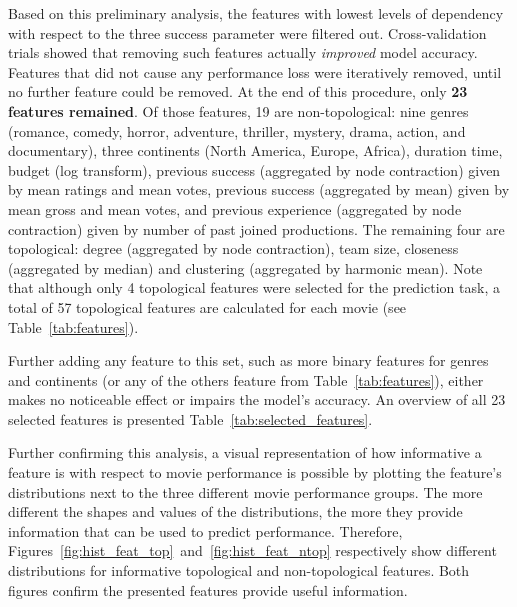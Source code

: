 Based on this preliminary analysis, the features with lowest levels of
dependency with respect to the three success parameter were filtered out.
Cross-validation trials showed that removing such features actually
\textit{improved} model accuracy. Features that did not cause any performance
loss were iteratively removed, until no further feature could be removed.  At
the end of this procedure, only \textbf{23 features remained}. Of those
features, 19 are non-topological: nine genres (romance, comedy, horror,
adventure, thriller, mystery, drama, action, and documentary), three continents
(North America, Europe, Africa), duration time, budget (log transform),
previous success (aggregated by node contraction) given by mean ratings and
mean votes, previous success (aggregated by mean) given by mean gross and mean
votes, and previous experience (aggregated by node contraction) given by number
of past joined productions. The remaining four are topological: degree
(aggregated by node contraction), team size, closeness (aggregated by median)
and clustering (aggregated by harmonic mean). Note that although only 4
topological features were selected for the prediction task, a total of 57
topological features are calculated for each movie (see
Table~\ref{tab:features}).

Further adding any feature to this set, such as more binary features for
genres and continents (or any of the others feature from
Table~\ref{tab:features}), either makes no noticeable effect or impairs the
model's accuracy. An overview of all 23 selected features is presented
Table~\ref{tab:selected_features}.



Further confirming this analysis, a visual representation of how informative a
feature is with respect to movie performance is possible by plotting the
feature's distributions next to the three different movie performance groups.
The more different the shapes and values of the distributions, the more they
provide information that can be used to predict performance. Therefore,
Figures~\ref{fig:hist_feat_top}~and~\ref{fig:hist_feat_ntop} respectively show
different distributions for informative topological and non-topological
features.  Both figures confirm the presented features provide useful
information.

\clearpage

